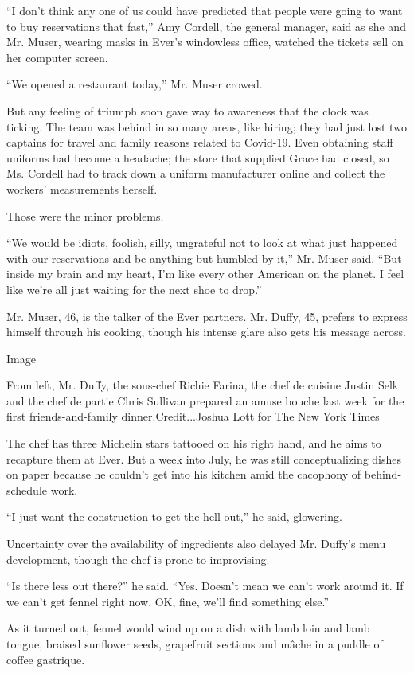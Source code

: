 ``I don't think any one of us could have predicted that people were
going to want to buy reservations that fast,'' Amy Cordell, the general
manager, said as she and Mr. Muser, wearing masks in Ever's windowless
office, watched the tickets sell on her computer screen.

``We opened a restaurant today,'' Mr. Muser crowed.

But any feeling of triumph soon gave way to awareness that the clock was
ticking. The team was behind in so many areas, like hiring; they had
just lost two captains for travel and family reasons related to
Covid-19. Even obtaining staff uniforms had become a headache; the store
that supplied Grace had closed, so Ms. Cordell had to track down a
uniform manufacturer online and collect the workers' measurements
herself.

Those were the minor problems.

``We would be idiots, foolish, silly, ungrateful not to look at what
just happened with our reservations and be anything but humbled by it,''
Mr. Muser said. ``But inside my brain and my heart, I'm like every other
American on the planet. I feel like we're all just waiting for the next
shoe to drop.''

Mr. Muser, 46, is the talker of the Ever partners. Mr. Duffy, 45,
prefers to express himself through his cooking, though his intense glare
also gets his message across.

Image

From left, Mr. Duffy, the sous-chef Richie Farina, the chef de cuisine
Justin Selk and the chef de partie Chris Sullivan prepared an amuse
bouche last week for the first friends-and-family dinner.Credit...Joshua
Lott for The New York Times

The chef has three Michelin stars tattooed on his right hand, and he
aims to recapture them at Ever. But a week into July, he was still
conceptualizing dishes on paper because he couldn't get into his kitchen
amid the cacophony of behind-schedule work.

``I just want the construction to get the hell out,'' he said,
glowering.

Uncertainty over the availability of ingredients also delayed Mr.
Duffy's menu development, though the chef is prone to improvising.

``Is there less out there?'' he said. ``Yes. Doesn't mean we can't work
around it. If we can't get fennel right now, OK, fine, we'll find
something else.''

As it turned out, fennel would wind up on a dish with lamb loin and lamb
tongue, braised sunflower seeds, grapefruit sections and mâche in a
puddle of coffee gastrique.


